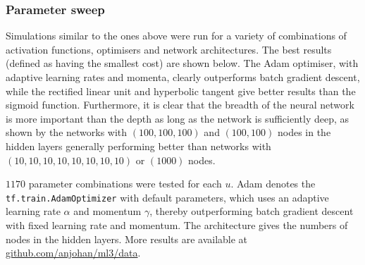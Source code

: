 \documentclass[11pt,british,a4paper]{article}
\numberwithin{equation}{section}
\begin{document}
\subsubsection{Parameter sweep}
Simulations similar to the ones above were run for a variety of combinations of activation functions, optimisers and network architectures. The best results (defined as having the smallest cost) are shown below. The Adam optimiser, with adaptive learning rates and momenta, clearly outperforms batch gradient descent, while the rectified linear unit and hyperbolic tangent give better results than the sigmoid function. Furthermore, it is clear that the breadth of the neural network is more important than the depth as long as the network is sufficiently deep, as shown by the networks with \((100,100,100)\) and \((100,100)\) nodes in the hidden layers generally performing better than networks with \((10,10,10,10,10,10,10,10)\) or \((1000)\) nodes.

\(\num{1170}\) parameter combinations were tested for each \(u\). Adam denotes the \lstinline{tf.train.AdamOptimizer} with default parameters, which uses an adaptive learning rate \(\alpha\) and momentum \(\gamma\), thereby outperforming batch gradient descent with fixed learning rate and momentum. The architecture gives the numbers of nodes in the hidden layers. More results are available at \href{https://github.com/anjohan/ml3/tree/master/data}{github.com/anjohan/ml3/data}.
\begin{table}[H]
    \centering
    \caption{\(u(x,t) = \sin(\pi x) + tx\qty(1-x)u(x,t)\).}
\end{table}
\begin{table}[H]
    \centering
    \caption{\(u(x,t) = \sin(\pi x)\qty(1 + tu(x,t))\).}
\end{table}
\end{document}
